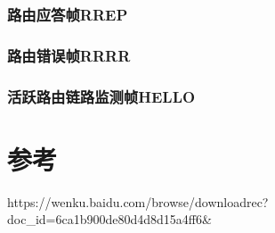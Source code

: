 \documentclass[a4paper]{article}
\begin{document}
\subsubsection{路由应答帧RREP}
\subsubsection{路由错误帧RRRR}
\subsubsection{活跃路由链路监测帧HELLO}
\section*{参考}
https://wenku.baidu.com/browse/downloadrec?doc\_id=6ca1b900de80d4d8d15a4ff6\&
\end{document}
